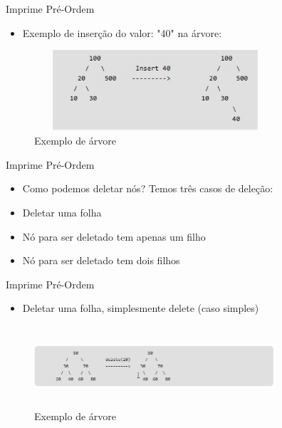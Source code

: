 \begin{frame}
	\begin{block}{Imprime Pré-Ordem}
		\begin{itemize}
			\item Exemplo de inserção do valor: "40" na árvore:
		\end{itemize}
		\begin{figure}[!htb]
			\centering	  				
			\includegraphics[height=3cm, width = 9cm]{./pic/insercao.jpg}
			\caption{Exemplo de árvore}
			\label{fig_pilha}
		\end{figure}
	\end{block}
\end{frame}


\begin{frame}
	\begin{block}{Imprime Pré-Ordem}
		\begin{itemize}
			\item Como podemos deletar nós? Temos três casos de deleção:

			\item Deletar uma folha
			
			\item Nó para ser deletado tem apenas um filho
			
			\item Nó para ser deletado tem dois filhos
		\end{itemize}
	\end{block}
\end{frame}


\begin{frame}
	\begin{block}{Imprime Pré-Ordem}
		\begin{itemize}
			\item Deletar uma folha, simplesmente delete (caso simples)
		\end{itemize}
		\begin{figure}[!htb]
			\centering	  				
			\includegraphics[height=3cm, width = 9cm]{./pic/delecao1.jpg}
			\caption{Exemplo de árvore}
			\label{fig_pilha}
		\end{figure}
	\end{block}
\end{frame}

